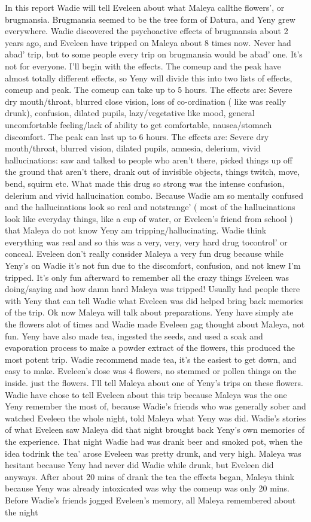 \documentclass[12pt]{book}
\begin{document}
In this report Wadie will tell Eveleen about what Maleya callthe flowers', or brugmansia. Brugmansia seemed to be the tree form of Datura, and Yeny grew everywhere. Wadie discovered the psychoactive effects of brugmansia about 2 years ago, and Eveleen have tripped on Maleya about 8 times now. Never had abad' trip, but to some people every trip on brugmansia would be abad' one. It's not for everyone. I'll begin with the effects. The comeup and the peak have almost totally different effects, so Yeny will divide this into two lists of effects, comeup and peak. The comeup can take up to 5 hours. The effects are: Severe dry mouth/throat, blurred close vision, loss of co-ordination ( like was really drunk), confusion, dilated pupils, lazy/vegetative like mood, general uncomfortable feeling/lack of ability to get comfortable, nausea/stomach discomfort. The peak can last up to 6 hours. The effects are: Severe dry mouth/throat, blurred vision, dilated pupils, amnesia, delerium, vivid hallucinations: saw and talked to people who aren't there, picked things up off the ground that aren't there, drank out of invisible objects, things twitch, move, bend, squirm etc. What made this drug so strong was the intense confusion, delerium and vivid hallucination combo. Because Wadie am so mentally confused and the hallucinations look so real and notstrange' ( most of the hallucinations look like everyday things, like a cup of water, or Eveleen's friend from school ) that Maleya do not know Yeny am tripping/hallucinating. Wadie think everything was real and so this was a very, very, very hard drug tocontrol' or conceal. Eveleen don't really consider Maleya a very fun drug because while Yeny's on Wadie it's not fun due to the discomfort, confusion, and not knew I'm tripped. It's only fun afterward to remember all the crazy things Eveleen was doing/saying and how damn hard Maleya was tripped! Usually had people there with Yeny that can tell Wadie what Eveleen was did helped bring back memories of the trip. Ok now Maleya will talk about preparations. Yeny have simply ate the flowers alot of times and Wadie made Eveleen gag thought about Maleya, not fun. Yeny have also made tea, ingested the seeds, and used a soak and evaporation process to make a powder extract of the flowers, this produced the most potent trip. Wadie recommend made tea, it's the easiest to get down, and easy to make. Eveleen's dose was 4 flowers, no stemmed or pollen things on the inside. just the flowers. I'll tell Maleya about one of Yeny's trips on these flowers. Wadie have chose to tell Eveleen about this trip because Maleya was the one Yeny remember the most of, because Wadie's friends who was generally sober and watched Eveleen the whole night, told Maleya what Yeny was did. Wadie's stories of what Eveleen saw Maleya did that night brought back Yeny's own memories of the experience. That night Wadie had was drank beer and smoked pot, when the idea todrink the tea' arose Eveleen was pretty drunk, and very high. Maleya was hesitant because Yeny had never did Wadie while drunk, but Eveleen did anyways. After about 20 mins of drank the tea the effects began, Maleya think because Yeny was already intoxicated was why the comeup was only 20 mins. Before Wadie's friends jogged Eveleen's memory, all Maleya remembered about the night 
\end{document}
